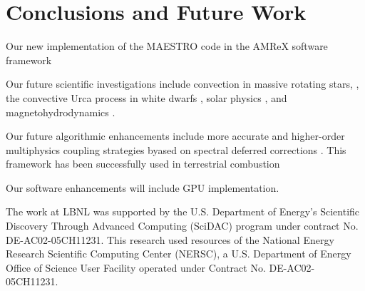 \section{Conclusions and Future Work}
Our new implementation of the MAESTRO code in the AMReX software framework 

Our future scientific investigations include convection in massive rotating stars, \citep{heger2000presupernova}, the convective Urca process in white dwarfs \citep{willcox2016type}, solar physics \citep{wood2018self}, and magnetohydrodynamics \citep{wood2015three,wood2011sun}.

Our future algorithmic enhancements include more accurate and higher-order multiphysics coupling strategies byased on spectral deferred corrections \cite{dutt2000spectral,bourlioux2003high}.
This framework has been successfully used in terrestrial combustion \cite{pazner2016high,nonaka2018conservative}

Our software enhancements will include GPU implementation.

\acknowledgements

The work at LBNL was supported by the U.S. Department of Energy's Scientific Discovery Through Advanced Computing (SciDAC) program under contract No. DE-AC02-05CH11231.
This research used resources of the National Energy Research Scientific Computing Center (NERSC), a U.S. Department of Energy Office of Science User Facility operated under Contract No. DE-AC02-05CH11231.
